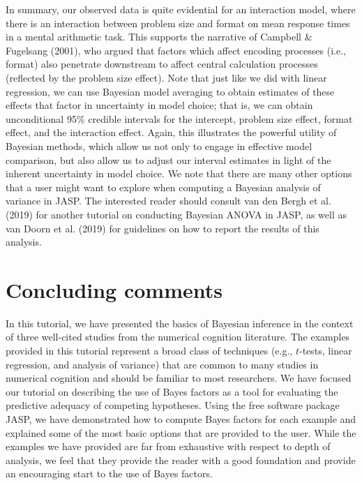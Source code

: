 \documentclass[english,,doc,floatsintext]{apa6}
\begin{document}
In summary, our observed data is quite evidential for an interaction model, where there is an interaction between problem size and format on mean response times in a mental arithmetic task. This supports the narrative of Campbell \& Fugelsang (2001), who argued that factors which affect encoding processes (i.e., format) also penetrate downstream to affect central calculation processes (reflected by the problem size effect). Note that just like we did with linear regression, we can use Bayesian model averaging to obtain estimates of these effects that factor in uncertainty in model choice; that is, we can obtain unconditional 95\% credible intervals for the intercept, problem size effect, format effect, and the interaction effect. Again, this illustrates the powerful utility of Bayesian methods, which allow us not only to engage in effective model comparison, but also allow us to adjust our interval estimates in light of the inherent uncertainty in model choice. We note that there are many other options that a user might want to explore when computing a Bayesian analysis of variance in JASP. The interested reader should consult van den Bergh et al. (2019) for another tutorial on conducting Bayesian ANOVA in JASP, as well as van Doorn et al. (2019) for guidelines on how to report the results of this analysis.

\hypertarget{concluding-comments}{%
\section{Concluding comments}\label{concluding-comments}}

In this tutorial, we have presented the basics of Bayesian inference in the context of three well-cited studies from the numerical cognition literature. The examples provided in this tutorial represent a broad class of techniques (e.g., \(t\)-tests, linear regression, and analysis of variance) that are common to many studies in numerical cognition and should be familiar to most researchers. We have focused our tutorial on describing the use of Bayes factors as a tool for evaluating the predictive adequacy of competing hypotheses. Using the free software package JASP, we have demonstrated how to compute Bayes factors for each example and explained some of the most basic options that are provided to the user. While the examples we have provided are far from exhaustive with respect to depth of analysis, we feel that they provide the reader with a good foundation and provide an encouraging start to the use of Bayes factors.
\end{document}
